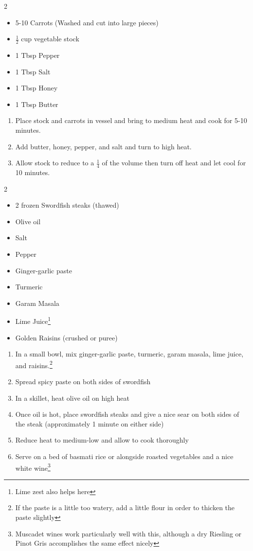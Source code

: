 \documentclass[oneside]{recipe}
\newcommand{\recipecolumn}[2]{
	\begin{multicols}{2}
	\raggedcolumns
	#1
	\columnbreak
	#2
	\end{multicols}
}
\begin{document}
\recipecolumn{
	\begin{itemize}
	\item 5-10 Carrots (Washed and cut into large pieces)
	\item $\frac{1}{2}$ cup vegetable stock
	\item 1 Tbsp Pepper
	\item 1 Tbsp Salt
	\item 1 Tbsp Honey
	\item 1 Tbsp Butter
	\end{itemize}
}{
	\begin{enumerate}
	\item Place stock and carrots in vessel and bring to medium heat and cook for 5-10 minutes.
	\item Add butter, honey, pepper, and salt and turn to high heat. 
	\item Allow stock to reduce to a $\frac{1}{4}$ of the volume then turn off heat and let cool for 10 minutes. 
	\end{enumerate}
}

\recipecolumn{
	\begin{itemize}
		\item 2 frozen Swordfish steaks (thawed)
		\item Olive oil
		\item Salt
		\item Pepper
		\item Ginger-garlic paste
		\item Turmeric
		\item Garam Masala
		\item Lime Juice\footnote{Lime zest also helps here}
		\item Golden Raisins (crushed or puree)
	\end{itemize}
}{
	\begin{enumerate}
		\item In a small bowl, mix ginger-garlic paste, turmeric, garam masala, lime juice, and raisins.\footnote{If the paste is a little too watery, add a little flour in order to thicken the paste slightly}
		\item Spread spicy paste on both sides of swordfish
		\item In a skillet, heat olive oil on high heat
		\item Once oil is hot, place swordfish steaks and give a nice sear on both sides of the steak (approximately 1 minute on either side)
		\item Reduce heat to medium-low and allow to cook thoroughly
		\item Serve on a bed of basmati rice or alongside roasted vegetables and a nice white wine\footnote{Muscadet wines work particularly well with this, although a dry Riesling or Pinot Gris accomplishes the same effect nicely}
	\end{enumerate}
}
\end{document}

